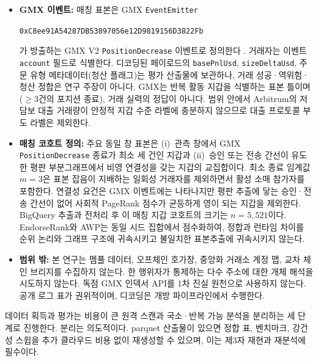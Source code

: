 \begin{itemize}
\item \textbf{GMX 이벤트:} 매칭 표본은 GMX \texttt{EventEmitter}
\begin{center}
\texttt{0xC8ee91A54287DB53897056e12D9819156D3822Fb}
\end{center}
가 방출하는 GMX V2 \texttt{PositionDecrease} 이벤트로 정의한다 . 거래자는 이벤트 \texttt{account} 필드로 식별한다. 디코딩된 페이로드의 \texttt{basePnlUsd}, \texttt{sizeDeltaUsd}, 주문 유형 메타데이터(청산 플래그)는 평가 산출물에 보관하나, 거래 성공·역위험·청산 정합은 연구 주장이 아니다. GMX는 반복 활동 지갑을 식별하는 표본 틀이며($\geq 3$건의 포지션 종료), 거래 실력의 정답이 아니다. 범위 안에서 Arbitrum의 저담보 대출 거래량이 안정적 지갑 수준 라벨에 충분하지 않으므로 대출 프로토콜 부도 라벨은 제외한다.

\item \textbf{매칭 코호트 정의:} 주요 동일 창 표본은 (i)~관측 창에서 GMX \texttt{PositionDecrease} 종료가 최소 세 건인 지갑과 (ii)~승인 또는 전송 간선이 유도한 평판 부분그래프에서 비영 연결성을 갖는 지갑의 교집합이다. 최소 종료 임계값 $m=3$은 표본 잡음이 지배하는 일회성 거래자를 제외하면서 활성 소매 참가자를 포함한다. 연결성 요건은 GMX 이벤트에는 나타나지만 평판 추출에 닿는 승인·전송 간선이 없어 사회적 PageRank 점수가 균등하게 영이 되는 지갑을 제외한다. BigQuery 추출과 전처리 후 이 매칭 지갑 코호트의 크기는 $n=5{,}521$이다. EndorseRank와 AWP는 동일 시드 집합에서 점수화하여, 정합과 런타임 차이를 순위 논리와 그래프 구조에 귀속시키고 불일치한 표본추출에 귀속시키지 않는다.

\item \textbf{범위 밖:} 본 연구는 멤풀 데이터, 오프체인 호가창, 중앙화 거래소 계정 맵, 교차 체인 브리지를 수집하지 않는다. 한 행위자가 통제하는 다수 주소에 대한 개체 해석을 시도하지 않는다. 독점 GMX 인덱서 API를 1차 진실 원천으로 사용하지 않는다. 공개 로그 표가 권위적이며, 디코딩은 개방 파이프라인에서 수행한다.

\end{itemize}


데이터 획득과 평가는 비용이 큰 원격 스캔과 국소·반복 가능 분석을 분리하는 세 단계로 진행한다. 분리는 의도적이다. parquet 산출물이 있으면 정합 표, 벤치마크, 강건성 스윕을 추가 클라우드 비용 없이 재생성할 수 있으며, 이는 제3자 재현과 재분석에 필수이다.

